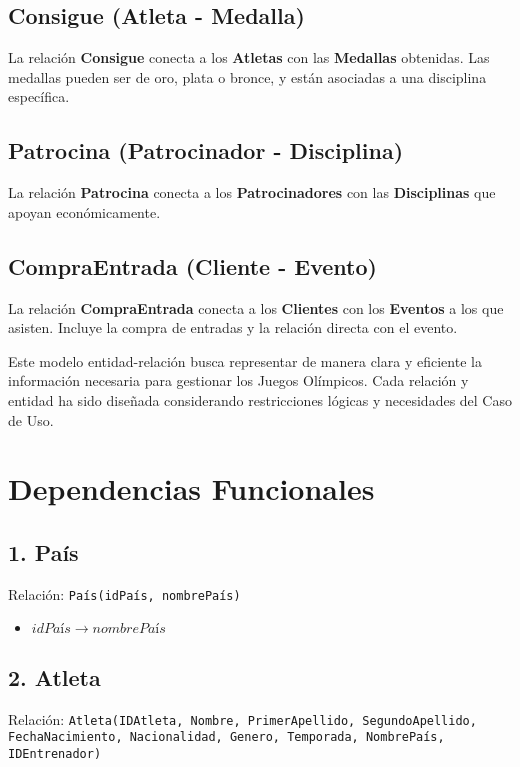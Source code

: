 \subsection*{Consigue (Atleta - Medalla)}
La relación \textbf{Consigue} conecta a los \textbf{Atletas} con las \textbf{Medallas} obtenidas. Las medallas pueden ser de oro, plata o bronce, y están asociadas a una disciplina específica.

\subsection*{Patrocina (Patrocinador - Disciplina)}
La relación \textbf{Patrocina} conecta a los \textbf{Patrocinadores} con las \textbf{Disciplinas} que apoyan económicamente.

\subsection*{CompraEntrada (Cliente - Evento)}
La relación \textbf{CompraEntrada} conecta a los \textbf{Clientes} con los \textbf{Eventos} a los que asisten. Incluye la compra de entradas y la relación directa con el evento.

Este modelo entidad-relación busca representar de manera clara y eficiente la información necesaria para gestionar los Juegos Olímpicos. Cada relación y entidad ha sido diseñada considerando restricciones lógicas y necesidades del Caso de Uso.

\section*{Dependencias Funcionales}

\subsection*{1. País}
Relación: \texttt{País(idPaís, nombrePaís)}

\begin{itemize}
    \item $idPaís \rightarrow nombrePaís$
\end{itemize}

\subsection*{2. Atleta}
Relación: \texttt{Atleta(IDAtleta, Nombre, PrimerApellido, SegundoApellido, FechaNacimiento, Nacionalidad, Genero, Temporada, NombrePaís, IDEntrenador)}


